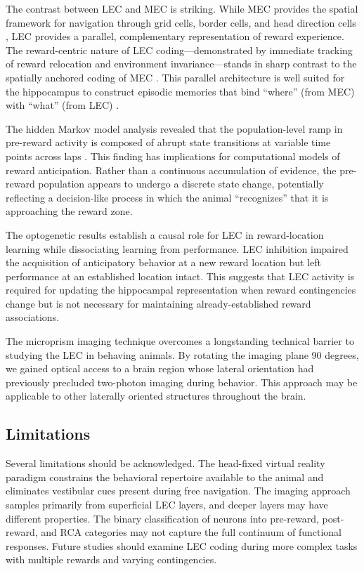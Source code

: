 \documentclass[11pt]{article}
\begin{document}
The contrast between LEC and MEC is striking. While MEC provides the spatial framework for navigation through grid cells, border cells, and head direction cells \citep{hafting2005, solstad2008, sargolini2006}, LEC provides a parallel, complementary representation of reward experience. The reward-centric nature of LEC coding---demonstrated by immediate tracking of reward relocation and environment invariance---stands in sharp contrast to the spatially anchored coding of MEC \citep{hardcastle2017}. This parallel architecture is well suited for the hippocampus to construct episodic memories that bind ``where'' (from MEC) with ``what'' (from LEC) \citep{hasselmo2009, eichenbaum2014}.

The hidden Markov model analysis revealed that the population-level ramp in pre-reward activity is composed of abrupt state transitions at variable time points across laps \citep{rabinovich2008}. This finding has implications for computational models of reward anticipation. Rather than a continuous accumulation of evidence, the pre-reward population appears to undergo a discrete state change, potentially reflecting a decision-like process in which the animal ``recognizes'' that it is approaching the reward zone.

The optogenetic results establish a causal role for LEC in reward-location learning while dissociating learning from performance. LEC inhibition impaired the acquisition of anticipatory behavior at a new reward location but left performance at an established location intact. This suggests that LEC activity is required for updating the hippocampal representation when reward contingencies change but is not necessary for maintaining already-established reward associations.

The microprism imaging technique overcomes a longstanding technical barrier to studying the LEC in behaving animals. By rotating the imaging plane 90 degrees, we gained optical access to a brain region whose lateral orientation had previously precluded two-photon imaging during behavior. This approach may be applicable to other laterally oriented structures throughout the brain.

\subsection{Limitations}

Several limitations should be acknowledged. The head-fixed virtual reality paradigm constrains the behavioral repertoire available to the animal and eliminates vestibular cues present during free navigation. The imaging approach samples primarily from superficial LEC layers, and deeper layers may have different properties. The binary classification of neurons into pre-reward, post-reward, and RCA categories may not capture the full continuum of functional responses. Future studies should examine LEC coding during more complex tasks with multiple rewards and varying contingencies.
\end{document}
